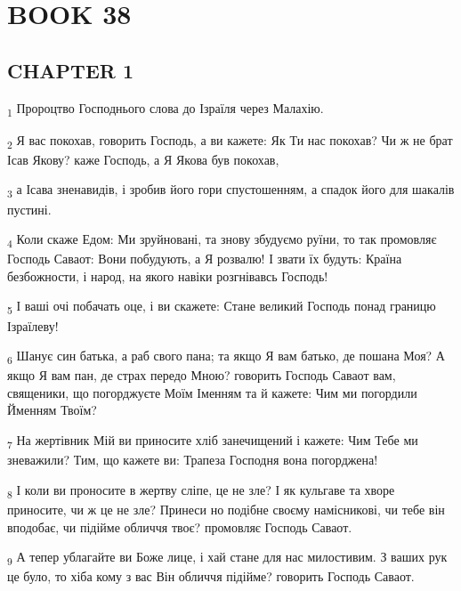 \section{BOOK 38}
\subsection{CHAPTER 1}
\begin{tcolorbox}
\textsubscript{1} Пророцтво Господнього слова до Ізраїля через Малахію.
\end{tcolorbox}
\begin{tcolorbox}
\textsubscript{2} Я вас покохав, говорить Господь, а ви кажете: Як Ти нас покохав? Чи ж не брат Ісав Якову? каже Господь, а Я Якова був покохав,
\end{tcolorbox}
\begin{tcolorbox}
\textsubscript{3} а Ісава зненавидів, і зробив його гори спустошенням, а спадок його для шакалів пустині.
\end{tcolorbox}
\begin{tcolorbox}
\textsubscript{4} Коли скаже Едом: Ми зруйновані, та знову збудуємо руїни, то так промовляє Господь Саваот: Вони побудують, а Я розвалю! І звати їх будуть: Країна безбожности, і народ, на якого навіки розгнівавсь Господь!
\end{tcolorbox}
\begin{tcolorbox}
\textsubscript{5} І ваші очі побачать оце, і ви скажете: Стане великий Господь понад границю Ізраїлеву!
\end{tcolorbox}
\begin{tcolorbox}
\textsubscript{6} Шанує син батька, а раб свого пана; та якщо Я вам батько, де пошана Моя? А якщо Я вам пан, де страх передо Мною? говорить Господь Саваот вам, священики, що погорджуєте Моїм Іменням та й кажете: Чим ми погордили Йменням Твоїм?
\end{tcolorbox}
\begin{tcolorbox}
\textsubscript{7} На жертівник Мій ви приносите хліб занечищений і кажете: Чим Тебе ми зневажили? Тим, що кажете ви: Трапеза Господня вона погорджена!
\end{tcolorbox}
\begin{tcolorbox}
\textsubscript{8} І коли ви проносите в жертву сліпе, це не зле? І як кульгаве та хворе приносите, чи ж це не зле? Принеси но подібне своєму намісникові, чи тебе він вподобає, чи підійме обличчя твоє? промовляє Господь Саваот.
\end{tcolorbox}
\begin{tcolorbox}
\textsubscript{9} А тепер ублагайте ви Боже лице, і хай стане для нас милостивим. З ваших рук це було, то хіба кому з вас Він обличчя підійме? говорить Господь Саваот.
\end{tcolorbox}
